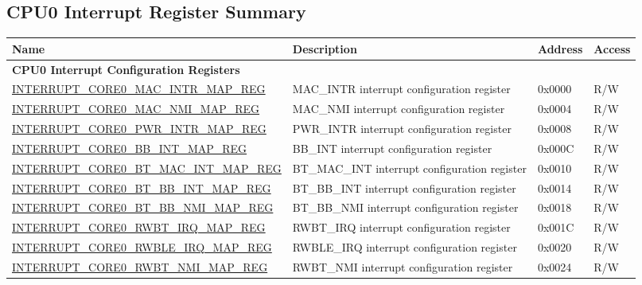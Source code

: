 \begin{landscape}
\chapter{CPU0 Interrupt Register Summary} \label{CPU0RegisterSummary}
\begin{longtable}{ | p{10cm} | p{10.2cm} | p{1.3cm} | p{1cm} | }
\hline\rowcolor{lightgray}
Name & Description &  Address & Access \\ \hline
\endhead
\multicolumn{4}{|l|}{\textbf{CPU0 Interrupt Configuration Registers}} \\ \hline
\hyperref[regdesc:INTERRUPTCORE0MACINTRMAPREG]{INTERRUPT\_CORE0\_MAC\_INTR\_MAP\_REG} &  MAC\_INTR interrupt configuration register & 0x0000 & R/W \\ \hline
\hyperref[regdesc:INTERRUPTCORE0MACNMIMAPREG]{INTERRUPT\_CORE0\_MAC\_NMI\_MAP\_REG} & MAC\_NMI interrupt configuration register & 0x0004 & R/W \\ \hline
\hyperref[regdesc:INTERRUPTCORE0PWRINTRMAPREG]{INTERRUPT\_CORE0\_PWR\_INTR\_MAP\_REG} & PWR\_INTR interrupt configuration register & 0x0008 & R/W \\ \hline
\hyperref[regdesc:INTERRUPTCORE0BBINTMAPREG]{INTERRUPT\_CORE0\_BB\_INT\_MAP\_REG} & BB\_INT interrupt configuration register & 0x000C & R/W \\ \hline
\hyperref[regdesc:INTERRUPTCORE0BTMACINTMAPREG]{INTERRUPT\_CORE0\_BT\_MAC\_INT\_MAP\_REG} & BT\_MAC\_INT interrupt configuration register & 0x0010 & R/W \\ \hline
\hyperref[regdesc:INTERRUPTCORE0BTBBINTMAPREG]{INTERRUPT\_CORE0\_BT\_BB\_INT\_MAP\_REG} & BT\_BB\_INT interrupt configuration register & 0x0014 & R/W \\ \hline
\hyperref[regdesc:INTERRUPTCORE0BTBBNMIMAPREG]{INTERRUPT\_CORE0\_BT\_BB\_NMI\_MAP\_REG} & BT\_BB\_NMI interrupt configuration register & 0x0018 & R/W \\ \hline
\hyperref[regdesc:INTERRUPTCORE0RWBTIRQMAPREG]{INTERRUPT\_CORE0\_RWBT\_IRQ\_MAP\_REG} & RWBT\_IRQ interrupt configuration register & 0x001C & R/W \\ \hline
\hyperref[regdesc:INTERRUPTCORE0RWBLEIRQMAPREG]{INTERRUPT\_CORE0\_RWBLE\_IRQ\_MAP\_REG} & RWBLE\_IRQ interrupt configuration register & 0x0020 & R/W \\ \hline
\hyperref[regdesc:INTERRUPTCORE0RWBTNMIMAPREG]{INTERRUPT\_CORE0\_RWBT\_NMI\_MAP\_REG} & RWBT\_NMI interrupt configuration register & 0x0024 & R/W \\ \hline

\end{longtable}
\end{landscape}
